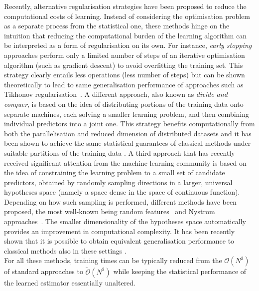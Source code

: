 \documentclass[a4paper, 11pt]{article}
\begin{document}
Recently, alternative regularisation strategies have been proposed to reduce the computational costs of learning. Instead of considering the optimisation problem as a separate process from the statistical one, these methods hinge on the intuition that reducing the computational burden of the learning algorithm can be interpreted as a form of regularisation on its own. For instance, {\em early stopping} approaches perform only a limited number of steps of an iterative optimisation algorithm (such as gradient descent) to avoid overfitting the training set. This strategy clearly entails less operations (less number of steps) but can be shown theoretically to lead to same generalisation performance of approaches such as Tikhonov regularisation~\cite{bauer2007regularization}. A different approach, also known as {\em divide and conquer}, is based on the idea of distributing portions of the training data onto separate machines, each solving a smaller learning problem, and then combining individual predictors into a joint one. This strategy benefits computationally from both the parallelisation and reduced dimension of distributed datasets and it has been shown to achieve the same statistical guarantees of classical methods under suitable partitions of the training data \cite{zhang2013divide}. A third approach that has recently received significant attention from the machine learning community is based on the idea of constraining the learning problem to a small set of candidate predictors, obtained by randomly sampling directions in a larger, universal hypotheses space (namely a space dense in the space of continuous function). Depending on how such sampling is performed, different methods have been proposed, the most well-known being random features~\cite{rahimi2007random} and Nystrom approaches~\cite{smola2000sparse,williams2000using}. The smaller dimensionality of the hypotheses space automatically provides an improvement in computational complexity. It has been recently shown that it is possible to obtain equivalent generalisation performance to classical methods also in these settings \cite{rudi2015less}.\\

For all these methods, training times can be typically reduced from the $\mathcal O(N^3)$ of standard approaches to $\widetilde{ \mathcal{O}} (N^2)$ while keeping the statistical performance of the learned estimator essentially unaltered. \\
\end{document}
